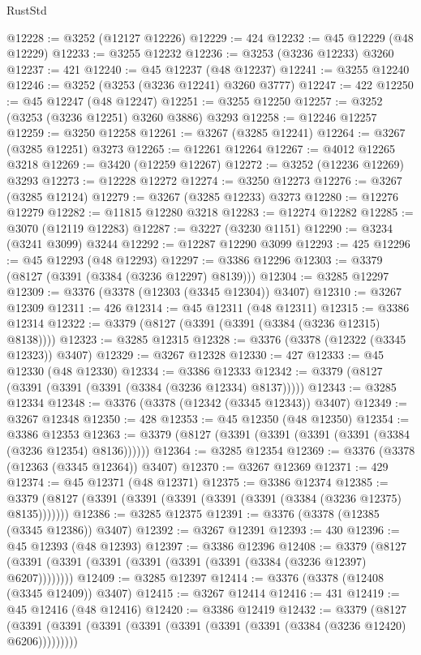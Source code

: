 \begin{lexlean}{RustStd}
\begin{coremodule}
@12228 := @3252 (@12127 @12226)
@12229 := 424
@12232 := @45 @12229 (@48 @12229)
@12233 := @3255 @12232
@12236 := @3253 (@3236 @12233) @3260
@12237 := 421
@12240 := @45 @12237 (@48 @12237)
@12241 := @3255 @12240
@12246 := @3252 (@3253 (@3236 @12241) @3260 @3777)
@12247 := 422
@12250 := @45 @12247 (@48 @12247)
@12251 := @3255 @12250
@12257 := @3252 (@3253 (@3236 @12251) @3260 @3886) @3293
@12258 := @12246 @12257
@12259 := @3250 @12258
@12261 := @3267 (@3285 @12241)
@12264 := @3267 (@3285 @12251) @3273
@12265 := @12261 @12264
@12267 := @4012 @12265 @3218
@12269 := @3420 (@12259 @12267)
@12272 := @3252 (@12236 @12269) @3293
@12273 := @12228 @12272
@12274 := @3250 @12273
@12276 := @3267 (@3285 @12124)
@12279 := @3267 (@3285 @12233) @3273
@12280 := @12276 @12279
@12282 := @11815 @12280 @3218
@12283 := @12274 @12282
@12285 := @3070 (@12119 @12283)
@12287 := @3227 (@3230 @1151)
@12290 := @3234 (@3241 @3099) @3244
@12292 := @12287 @12290 @3099
@12293 := 425
@12296 := @45 @12293 (@48 @12293)
@12297 := @3386 @12296
@12303 := @3379 (@8127 (@3391 (@3384 (@3236 @12297) @8139)))
@12304 := @3285 @12297
@12309 := @3376 (@3378 (@12303 (@3345 @12304)) @3407)
@12310 := @3267 @12309
@12311 := 426
@12314 := @45 @12311 (@48 @12311)
@12315 := @3386 @12314
@12322 := @3379 (@8127 (@3391 (@3391 (@3384 (@3236 @12315) @8138))))
@12323 := @3285 @12315
@12328 := @3376 (@3378 (@12322 (@3345 @12323)) @3407)
@12329 := @3267 @12328
@12330 := 427
@12333 := @45 @12330 (@48 @12330)
@12334 := @3386 @12333
@12342 := @3379 (@8127 (@3391 (@3391 (@3391 (@3384 (@3236 @12334) @8137)))))
@12343 := @3285 @12334
@12348 := @3376 (@3378 (@12342 (@3345 @12343)) @3407)
@12349 := @3267 @12348
@12350 := 428
@12353 := @45 @12350 (@48 @12350)
@12354 := @3386 @12353
@12363 := @3379 (@8127 (@3391 (@3391 (@3391 (@3391 (@3384 (@3236 @12354) @8136))))))
@12364 := @3285 @12354
@12369 := @3376 (@3378 (@12363 (@3345 @12364)) @3407)
@12370 := @3267 @12369
@12371 := 429
@12374 := @45 @12371 (@48 @12371)
@12375 := @3386 @12374
@12385 := @3379 (@8127 (@3391 (@3391 (@3391 (@3391 (@3391 (@3384 (@3236 @12375) @8135)))))))
@12386 := @3285 @12375
@12391 := @3376 (@3378 (@12385 (@3345 @12386)) @3407)
@12392 := @3267 @12391
@12393 := 430
@12396 := @45 @12393 (@48 @12393)
@12397 := @3386 @12396
@12408 := @3379 (@8127 (@3391 (@3391 (@3391 (@3391 (@3391 (@3391 (@3384 (@3236 @12397) @6207))))))))
@12409 := @3285 @12397
@12414 := @3376 (@3378 (@12408 (@3345 @12409)) @3407)
@12415 := @3267 @12414
@12416 := 431
@12419 := @45 @12416 (@48 @12416)
@12420 := @3386 @12419
@12432 := @3379
    (@8127 (@3391 (@3391 (@3391 (@3391 (@3391 (@3391 (@3391 (@3384 (@3236 @12420) @6206)))))))))

\end{coremodule}
\end{lexlean}
